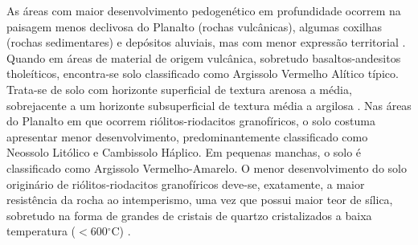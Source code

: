 
As áreas com maior desenvolvimento pedogenético em profundidade ocorrem na paisagem menos declivosa do Planalto (rochas vulcânicas), algumas coxilhas (rochas sedimentares) e depósitos aluviais, mas com menor expressão territorial \cite{Miguel2010}. Quando em áreas de material de origem vulcânica, sobretudo basaltos-andesitos tholeíticos, encontra-se solo classificado como Argissolo Vermelho Alítico típico. Trata-se de solo com horizonte superficial de textura arenosa a média, sobrejacente a um horizonte subsuperficial de textura média a argilosa \cite{Miguel2010}. Nas áreas do Planalto em que ocorrem riólitos-riodacitos granofíricos, o solo costuma apresentar menor desenvolvimento, predominantemente classificado como Neossolo Litólico e Cambissolo Háplico. Em pequenas manchas, o solo é classificado como Argissolo Vermelho-Amarelo. O menor desenvolvimento do solo originário de riólitos-riodacitos granofíricos deve-se, exatamente, a maior resistência da rocha ao intemperismo, uma vez que possui maior teor de sílica, sobretudo na forma de grandes de cristais de quartzo cristalizados a baixa temperatura ($<$600$^\circ$C) \cite{Pedron2007}.

